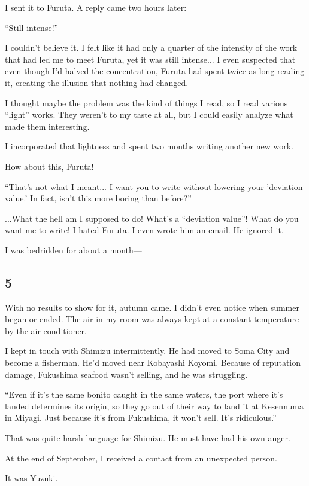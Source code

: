 \documentclass[
    a4paper,
    12pt,
    twoside,
    openany,
    UTF8,
    fontset=windows
]{ctexbook}
\begin{document}
I sent it to Furuta. A reply came two hours later:

``Still intense!''

I couldn't believe it. I felt like it had only a quarter of the intensity of the work that had led me to meet Furuta, yet it was still intense... I even suspected that even though I'd halved the concentration, Furuta had spent twice as long reading it, creating the illusion that nothing had changed.

I thought maybe the problem was the kind of things I read, so I read various ``light'' works. They weren't to my taste at all, but I could easily analyze what made them interesting.

I incorporated that lightness and spent two months writing another new work.

How about this, Furuta!

``That's not what I meant... I want you to write without lowering your 'deviation value.' In fact, isn't this more boring than before?''

...What the hell am I supposed to do! What's a ``deviation value''! What do you want me to write! I hated Furuta. I even wrote him an email. He ignored it.

I was bedridden for about a month---


\subsection*{5}

With no results to show for it, autumn came. I didn't even notice when summer began or ended. The air in my room was always kept at a constant temperature by the air conditioner.

I kept in touch with Shimizu intermittently. He had moved to Soma City and become a fisherman. He'd moved near Kobayashi Koyomi. Because of reputation damage, Fukushima seafood wasn't selling, and he was struggling.

``Even if it's the same bonito caught in the same waters, the port where it's landed determines its origin, so they go out of their way to land it at Kesennuma in Miyagi. Just because it's from Fukushima, it won't sell. It's ridiculous.''

That was quite harsh language for Shimizu. He must have had his own anger.

At the end of September, I received a contact from an unexpected person.

It was Yuzuki.
\end{document}

